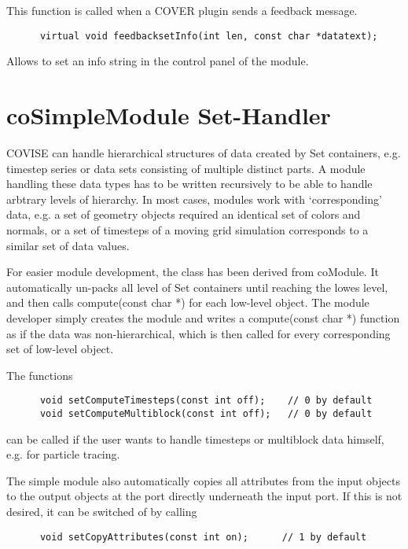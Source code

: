 This function is called when a COVER plugin sends a feedback message.

\begin{verbatim}
      virtual void feedbacksetInfo(int len, const char *datatext);
\end{verbatim}

Allows to set an info string in the control panel of the module.

\section{coSimpleModule Set-Handler}

COVISE can handle hierarchical structures of data created by Set containers, e.g. 
timestep series or data sets consisting of multiple distinct parts. A module handling 
these data types has to be written recursively to be able to handle arbtrary levels 
of hierarchy. In most cases, modules work with `corresponding' data, e.g. a set of 
geometry objects required an identical set of colors and normals, or a set of timesteps of a moving grid simulation
corresponds to a similar set of data values. 

For easier module development, the class  has been derived from 
coModule. It automatically un-packs all level of Set containers until reaching 
the lowes level, and then calls compute(const char *) for each low-level object. The module 
developer simply creates the module and writes a compute(const char *) function as if the data was 
non-hierarchical, which is then called for every corresponding set of low-level object. 

The functions

\begin{verbatim}
      void setComputeTimesteps(const int off);    // 0 by default
      void setComputeMultiblock(const int off);   // 0 by default
\end{verbatim}

can be called if the user wants to handle timesteps or multiblock data  himself, 
e.g. for particle tracing. 

The simple module also automatically copies all attributes from the input objects to the output objects at the port directly underneath the input port. If
this is not desired, it can be switched of by calling

\begin{verbatim}
      void setCopyAttributes(const int on);      // 1 by default
\end{verbatim}


